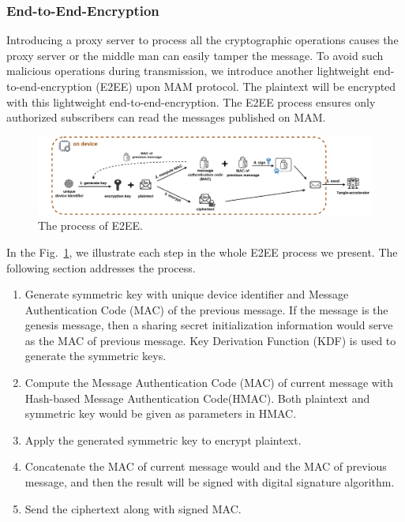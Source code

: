 \documentclass[conference]{IEEEtran}
\begin{document}
\subsubsection{End-to-End-Encryption}
Introducing a proxy server to process all the cryptographic operations causes the proxy server or the middle man can easily tamper the message. To avoid such malicious operations during transmission, we introduce another lightweight end-to-end-encryption (E2EE) upon MAM protocol. The plaintext will be encrypted with this lightweight end-to-end-encryption. The E2EE process ensures only authorized subscribers can read the messages published on MAM.

\begin{figure}[!t]
    \centering
    \includegraphics[width=\linewidth]{MAM_E2EE}
    \caption{The process of E2EE.}
    \label{fig:MAM_E2EE}
\end{figure}

In the Fig.~\ref{fig:MAM_E2EE}, we illustrate each step in the whole E2EE process we present. The following section addresses the process.

\begin{enumerate}
    \item Generate symmetric key with unique device identifier and Message Authentication Code (MAC) of the previous message. If the message is the genesis message, then a sharing secret initialization information would serve as the MAC of previous message. Key Derivation Function (KDF) is used to generate the symmetric keys.
    \item Compute the Message Authentication Code (MAC) of current message with Hash-based Message Authentication Code(HMAC). Both plaintext and symmetric key would be given as parameters in HMAC.
    \item Apply the generated symmetric key to encrypt plaintext.
    \item Concatenate the MAC of current message would and the MAC of previous message, and then the result will be signed with digital signature algorithm.
    \item Send the ciphertext along with signed MAC.
\end{enumerate}
\end{document}

